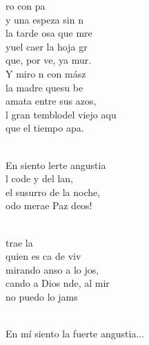 \documentclass[12pt]{article}
\begin{document}
\begin{multicols*}{2}
\begin{cancion}%
	ro con pa \\
	y una espeza sin n  \\
	la tarde osa que mre\\
	yuel caer  la hoja gr\\
	que, por ve, ya mur.\\
\jump
	Y miro n con mász\\
	la madre quesu be  \\
	amata entre sus azos,\\
	l gran temblodel viejo aqu\\
	que el tiempo apa. \\\jump\\
	\begin{chorus}%
	En siento lerte angustia\\
	l code y del lan, \\
	el susurro de la noche,\\
	odo merae Paz deos!\\
	\end{chorus}%
	\jump\\
	 trae la  \\
	quien es ca de viv  \\
	mirando anso a lo jos,\\
	cando a Dios nde, al mir\\
	no puedo lo jams\\\jump\\
	\begin{chorus}%
En mí siento la fuerte angustia...\\

\end{chorus}
\end{cancion}
\end{multicols*}
\end{document}
